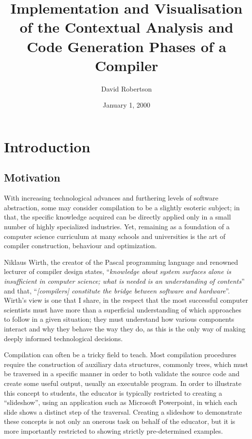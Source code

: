 \documentclass{l4proj}
\begin{document}
\title{Implementation and Visualisation of the Contextual Analysis and Code Generation Phases of a Compiler}
\author{David Robertson}
\date{January 1, 2000}
\maketitle

\begin{abstract}

\end{abstract}

\educationalconsent
%
%
\tableofcontents

\chapter{Introduction}
\section{Motivation}
With increasing technological advances and furthering levels of software abstraction, some may consider compilation to be a slightly esoteric subject; in that, the specific knowledge acquired can be directly applied only in a small number of highly specialized industries. Yet, remaining as a foundation of a computer science curriculum at many schools and universities is the art of compiler construction, behaviour and optimization.

Niklaus Wirth, the creator of the Pascal programming language and renowned lecturer of compiler design states, ``\textit{knowledge about system surfaces alone is insufficient in computer science; what is needed is an understanding of contents}'' and that, ``\textit{[compilers] constitute the bridge between software and hardware}''. Wirth's view is one that I share, in the respect that the most successful computer scientists must have more than a superficial understanding of which approaches to follow in a given situation; they must understand how various components interact and why they behave the way they do, as this is the only way of making deeply informed technological decisions.

Compilation can often be a tricky field to teach. Most compilation procedures require the construction of auxiliary data structures, commonly trees, which must be traversed in a specific manner in order to both validate the source code and create some useful output, usually an executable program. In order to illustrate this concept to students, the educator is typically restricted to creating a ``slideshow'', using an application such as Microsoft Powerpoint, in which each slide shows a distinct step of the traversal. Creating a slideshow to demonstrate these concepts is not only an onerous task on behalf of the educator, but it is more importantly restricted to showing strictly pre-determined examples. 
\end{document}
